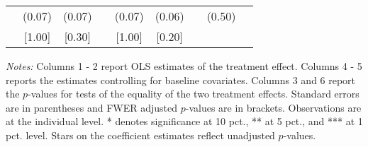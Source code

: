 \begin{table}[htbp]
{\begin{threeparttable}
\begin{tabular}{l*{8}{c}}
          &   (0.07)&   (0.07)&         &   (0.07)&   (0.06)&         &   (0.50)&         \\
          &   [1.00]&   [0.30]&         &   [1.00]&   [0.20]&         &         &         \\
\bottomrule \end{tabular} \begin{tablenotes}[flushleft] \footnotesize \item \emph{Notes:} Columns 1 - 2 report OLS estimates of the treatment effect. Columns 4 - 5 reports the estimates controlling for baseline covariates. Columns 3 and 6 report the \(p\)-values for tests of the equality of the two treatment effects. Standard errors are in parentheses and FWER adjusted \(p\)-values are in brackets. Observations are at the individual level. * denotes significance at 10 pct., ** at 5 pct., and *** at 1 pct. level. Stars on the coefficient estimates reflect unadjusted \(p\)-values. \end{tablenotes} \end{threeparttable} } \end{table}

